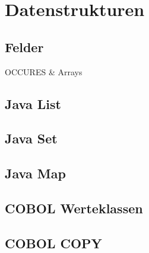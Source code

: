 \section{Datenstrukturen}

\subsection{Felder}
OCCURES \& Arrays

\subsection{Java List}

\subsection{Java Set}

\subsection{Java Map}

\subsection{COBOL Werteklassen}

\subsection{COBOL COPY}